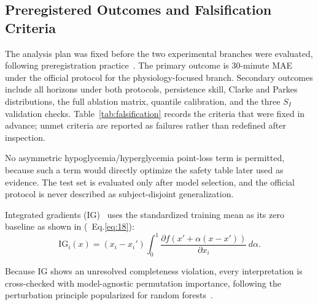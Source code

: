 \documentclass[journal]{IEEEtran}
\begin{document}
\subsection{Preregistered Outcomes and Falsification Criteria}

The analysis plan was fixed before the two experimental branches were evaluated, following preregistration practice~\cite{ref79}. The primary outcome is 30-minute MAE under the official protocol for the physiology-focused branch. Secondary outcomes include all horizons under both protocols, persistence skill, Clarke and Parkes distributions, the full ablation matrix, quantile calibration, and the three $S_I$ validation checks. Table~\ref{tab:falsification} records the criteria that were fixed in advance; unmet criteria are reported as failures rather than redefined after inspection.

No asymmetric hypoglycemia/hyperglycemia point-loss term is permitted, because such a term would directly optimize the safety table later used as evidence. The test set is evaluated only after model selection, and the official protocol is never described as subject-disjoint generalization.

Integrated gradients (IG)~\cite{ref54} uses the standardized training mean as its zero baseline as shown in (\ Eq.\eqref{eq:18}):
\begin{equation}
\text{IG}_i(x) = (x_i - x_i') \int_0^1 \frac{\partial f(x' + \alpha(x - x'))}{\partial x_i}\, d\alpha.
\label{eq:18}
\end{equation}

Because IG shows an unresolved completeness violation, every interpretation is cross-checked with model-agnostic permutation importance, following the perturbation principle popularized for random forests~\cite{ref55}.
\end{document}
